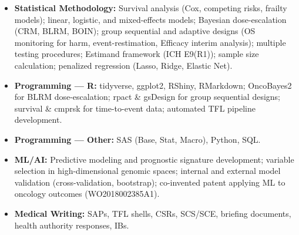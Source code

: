%
%
%

\vspace*{.2em}
\begin{itemize}\sloppy
\item[-] \textbf{Statistical Methodology:} Survival analysis (Cox, competing risks, frailty models); linear, logistic, and mixed-effects models; Bayesian dose-escalation (CRM, BLRM, BOIN); group sequential and adaptive designs (OS monitoring for harm, event-restimation, Efficacy interim analysis); multiple testing procedures; Estimand framework (ICH E9(R1)); sample size calculation; penalized regression (Lasso, Ridge, Elastic Net).%
\item[-] \textbf{Programming --- R:} tidyverse, ggplot2, RShiny, RMarkdown; OncoBayes2 for BLRM dose-escalation; rpact \& gsDesign for group sequential designs; survival \& cmprsk for time-to-event data; automated TFL pipeline development.
\item[-] \textbf{Programming --- Other:} SAS (Base, Stat, Macro), Python, SQL.%
\item[-] \textbf{ML/AI:} Predictive modeling and prognostic signature development; variable selection in high-dimensional genomic spaces; internal and external model validation (cross-validation, bootstrap); co-invented patent applying ML to oncology outcomes (WO2018002385A1).
\item[-] \textbf{Medical Writing:} SAPs, TFL shells, CSRs, SCS/SCE, briefing documents, health authority responses, IBs.
\end{itemize}
